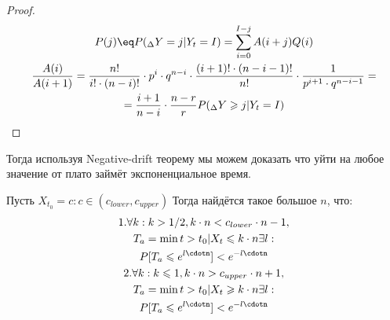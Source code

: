 \documentclass[times,specification,annotation]{itmo-student-thesis}
\begin{document}
    \begin{proof}
        \begin{gather*}
            P(j) \eq P(_{\Delta} Y = j|Y_t = I) = \sum_{i = 0}^{I - j} A(i + j)Q(i) \\
            \frac{A(i)}{A(i + 1)} = \frac{n!}{i! \cdot (n - i)!} \cdot p^i \cdot q^{n - i} \cdot \frac{(i + 1)! \cdot (n - i - 1)!}{n!} \cdot \frac{1}{p^{i + 1} \cdot q^{n - i - 1}} = \\
            = \frac{i + 1}{n - i} \cdot \frac{n - r}{r}
            P(_{\Delta} Y \geq j|Y_t = I)
        \end{gather*}

    \end{proof}


    Тогда используя Negative-drift теорему мы можем доказать что уйти на любое значение от плато займёт экспоненциальное время.

    \begin{theorem}
        Пусть $X_{t_0} = c: c \in (c_{lower}, c_{upper})$
        Тогда найдётся такое большое $n$, что:
        \begin{gather*}
            1. \forall k : k > 1/2, k \cdot n < c_{lower} \cdot n - 1, \\
            T_a = \min{t > t_0 | X_t \leq k \cdot n} \exists l: \\
            P[T_a \leq e^{l\cdotn}] < e^{-l\cdotn} \\
            2. \forall k : k  \leq 1, k \cdot n > c_{upper} \cdot n + 1, \\
            T_a = \min{t > t_0 | X_t \geq k \cdot n} \exists l: \\
            P[T_a \leq e^{l\cdotn}] < e^{-l\cdotn} \\
        \end{gather*}
    \end{theorem}
\end{document}
